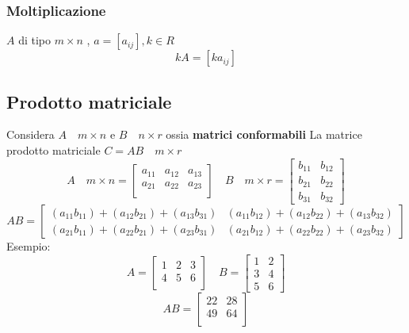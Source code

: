 \documentclass[12pt,a4paper,oneside]{article}
\begin{document}
\subsubsection*{Moltiplicazione}
$A$ di tipo $m \times n$ , $ a = \left[ a_{ij} \right] , k  \in  R$
\[
	kA = \left[ ka_{ij}\right]
\]
\subsection{Prodotto matriciale}
Considera $ A \quad  m \times n$ e $B \quad  n \times r$ ossia \textbf{matrici conformabili}
\vskip3mm
La matrice prodotto matriciale $ C = AB \quad m \times r$
\[
	A \quad m \times n= \begin{bmatrix}
		a_{11} & a_{12} & a_{13} \\
		a_{21} & a_{22} & a_{23} \\
	\end{bmatrix}
	\quad
	B \quad  m \times r = \begin{bmatrix}
		b_{11} & b_{12} \\
		b_{21} & b_{22} \\
		b_{31} & b_{32}
	\end{bmatrix}
\]
\[
	AB= \begin{bmatrix}
		\left( a_{11}  b_{11} \right) + \left( a_{12} b_{21} \right) + \left( a_{13} b_{31} \right) & \left( a_{11} b_{12} \right) + \left( a_{12} b_{22} \right)  + \left( a_{13} b_{32} \right) \\
		\left( a_{21} b_{11} \right) + \left( a_{22} b_{21} \right) + \left( a_{23} b_{31} \right)  & \left( a_{21}b_{12} \right) + \left( a_{22}b_{22} \right) + \left( a_{23}b_{32} \right)
	\end{bmatrix}
\]
Esempio:
\[
	A = \begin{bmatrix}
		1 & 2 & 3 \\
		4 & 5 & 6 \\
	\end{bmatrix}
	\quad
	B=
	\begin{bmatrix}
		1 & 2 \\
		3 & 4 \\
		5 & 6
	\end{bmatrix}
\]
\[
	AB= \begin{bmatrix}
		22 & 28 \\
		49 & 64 \\
	\end{bmatrix}
\]
\end{document}
